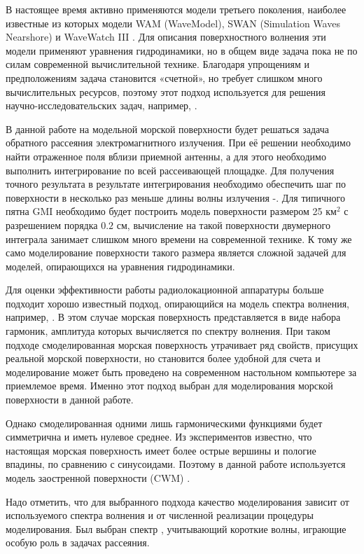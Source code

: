 В настоящее время активно применяются модели третьего поколения, наиболее
известные из которых модели WAM (WaveModel), SWAN (Simulation Waves Nearshore)
и WaveWatch III \cite{wavewatch3, swan, wam4}.  Для описания поверхностного
волнения эти модели применяют уравнения гидродинамики, но в общем виде задача
пока не по силам современной вычислительной технике. Благодаря упрощениям и
предположениям задача становится «счетной», но требует слишком много
вычислительных ресурсов, поэтому этот подход используется для решения
научно-исследовательских задач, например, \cite{slunyaev2006, slunyaev2009,
west1987}. 

В данной работе на модельной морской поверхности будет решаться задача
обратного рассеяния электромагнитного излучения.  При её решении необходимо
найти отраженное поля вблизи приемной антенны, а для этого необходимо выполнить
интегрирование по всей рассеивающей площадке.  Для получения точного результата в результате интегрирования необходимо
обеспечить шаг по поверхности в несколько раз меньше длины волны излучения
\cite{toporkov:brown:2000}-\cite{toporkov:brown:2002}. Для типичного пятна GMI необходимо будет построить
модель поверхности
размером 25 км$^2$ с разрешением порядка $0.2$ см, вычисление на такой
поверхности двумерного интеграла занимает слишком много времени на современной
технике. К тому же само моделирование поверхности такого размера является
сложной задачей для моделей, опирающихся на уравнения гидродинамики. 

Для оценки эффективности работы радиолокационной аппаратуры
больше подходит хорошо известный подход, опирающийся на модель спектра
волнения, например, \cite{longe-higgins}. В этом случае морская поверхность представляется в
виде набора гармоник, амплитуда которых вычисляется по спектру волнения. При
таком подходе смоделированная морская поверхность утрачивает ряд свойств,
присущих реальной морской поверхности, но становится более удобной для счета и
моделирование может быть проведено на современном настольном компьютере за
приемлемое время. Именно этот подход выбран для моделирования морской поверхности в данной работе. 

Однако смоделированная одними лишь гармоническими функциями будет симметрична
и иметь нулевое среднее. Из экспериментов \cite{shuleykin} известно, что
настоящая морская поверхность имеет более острые вершины и пологие впадины, по
сравнению с синусоидами. Поэтому в данной работе используется модель
заостренной поверхности (CWM) \cite{nouguier}.


Надо отметить, что для выбранного подхода
качество моделирования зависит от используемого спектра волнения и от численной
реализации процедуры моделирования. Был выбран спектр \cite{ryabkova},
учитывающий короткие волны, играющие особую роль в задачах рассеяния.


